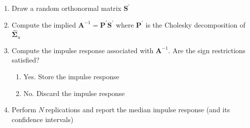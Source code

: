 \documentclass[11pt,a4paper]{report}
\numberwithin{equation}{chapter}
\numberwithin{section}{chapter}
\begin{document}
\begin{enumerate}
\item Draw a random orthonormal matrix $\mathbf{S}^{\prime }$

\item Compute the implied $\mathbf{A}^{-1}=\mathbf{P}^{\prime }\mathbf{S}%
^{\prime }$ where $\mathbf{P}^{\prime }$ is the Cholesky decomposition of $%
\mathbf{\hat{\Sigma}}_{u}$

\item Compute the impulse response associated with $\mathbf{A}^{-1}$. Are
the sign restrictions satisfied?

\begin{enumerate}
\item Yes. Store the impulse response

\item No. Discard the impulse response
\end{enumerate}

\item Perform $N\ $replications and report the median impulse response (and
its confidence intervals)
\end{enumerate}
\end{document}
